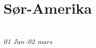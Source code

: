 \chapter*{Sør-Amerika}\\ {\footnotesize \textit{01 Jan--02 mars}}

\begin{figure}[!h]
      \centering
\noindent{}
\label{fig:colombia}
\end{figure}


